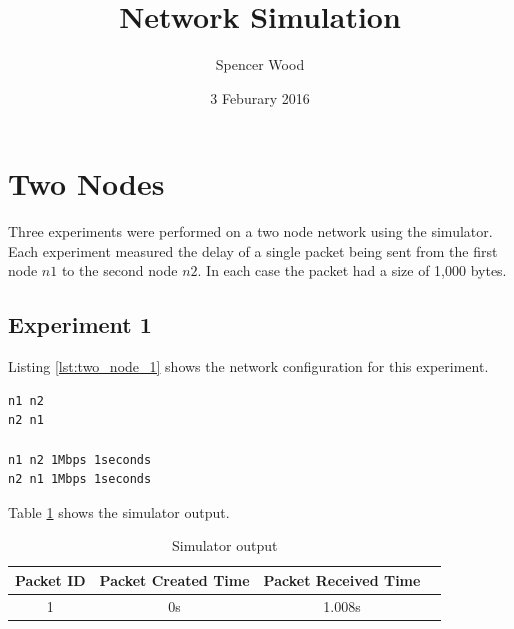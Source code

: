 \documentclass[fleqn,11pt]{article}
\begin{document}
\lstset{
  basicstyle=\small,          %
  keywordstyle=\bfseries,
  identifierstyle=,           %
  commentstyle=,              %
  stringstyle=\ttfamily,      %
  showstringspaces=false,     %
  numbers=left,
  numberstyle=\tiny,
  numbersep=5pt,
  frame=tb,
}

\title{Network Simulation}

\author{Spencer Wood}

\date{3 Feburary 2016}

\maketitle

\section{Two Nodes}

Three experiments were performed on a two node network using the simulator.
Each experiment measured the delay of a single packet being sent from the
first node $n1$ to the second node $n2$. In each case the packet had a size of
1,000 bytes.

\subsection{Experiment 1}
\vspace{0.5cm}

Listing \ref{lst:two_node_1} shows the network configuration for this experiment.

\vspace{0.5cm}
\begin{lstlisting}[caption={Network configuration},label={lst:two_node_1}]
n1 n2
n2 n1

n1 n2 1Mbps 1seconds
n2 n1 1Mbps 1seconds
\end{lstlisting}
\vspace{0.5cm}

\noindent
Table \ref{tab:two_node_1} shows the simulator output.

\begin{table}[h]
  \caption{Simulator output}
  \label{tab:two_node_1}
  \begin{center}
    \begin{tabular}{cccc}
      \toprule
      Packet ID & Packet Created Time & Packet Received Time & \\
      \midrule
      1 & 0s & 1.008s\\
      \bottomrule
    \end{tabular}
  \end{center}
\end{table}
\vspace{0.5cm}
\end{document}

